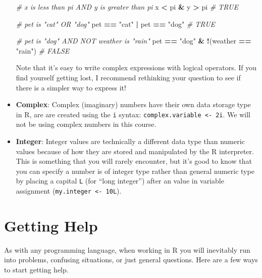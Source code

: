 \documentclass[]{book}
\newenvironment{Shaded}{\begin{snugshade}}{\end{snugshade}}
\newcommand{\StringTok}[1]{\textcolor[rgb]{0.31,0.60,0.02}{#1}}
\newcommand{\CommentTok}[1]{\textcolor[rgb]{0.56,0.35,0.01}{\textit{#1}}}
\newcommand{\OperatorTok}[1]{\textcolor[rgb]{0.81,0.36,0.00}{\textbf{#1}}}
\newcommand{\NormalTok}[1]{#1}
\theoremstyle{definition}
\theoremstyle{definition}
\theoremstyle{remark}
\begin{document}
\begin{itemize}
\begin{Shaded}
\begin{Highlighting}[]
\CommentTok{# x is less than pi AND y is greater than pi}
\NormalTok{x }\OperatorTok{<}\StringTok{ }\NormalTok{pi }\OperatorTok{&}\StringTok{ }\NormalTok{y }\OperatorTok{>}\StringTok{ }\NormalTok{pi  }\CommentTok{# TRUE}

\CommentTok{# pet is "cat" OR "dog"}
\NormalTok{pet }\OperatorTok{==}\StringTok{ "cat"} \OperatorTok{|}\StringTok{ }\NormalTok{pet }\OperatorTok{==}\StringTok{ "dog"}  \CommentTok{# TRUE}

\CommentTok{# pet is "dog" AND NOT weather is "rain"}
\NormalTok{pet }\OperatorTok{==}\StringTok{ "dog"} \OperatorTok{&}\StringTok{ }\OperatorTok{!}\NormalTok{(weather }\OperatorTok{==}\StringTok{ "rain"}\NormalTok{)  }\CommentTok{# FALSE}
\end{Highlighting}
\end{Shaded}

  Note that it's easy to write complex expressions with logical
  operators. If you find yourself getting lost, I recommend rethinking
  your question to see if there is a simpler way to express it!
\item
  \textbf{Complex}: Complex (imaginary) numbers have their own data
  storage type in R, are are created using the \texttt{i} syntax:
  \texttt{complex.variable\ \textless{}-\ 2i}. We will not be using
  complex numbers in this course.
\item
  \textbf{Integer}: Integer values are technically a different data type
  than numeric values because of how they are stored and manipulated by
  the R interpreter. This is something that you will rarely encounter,
  but it's good to know that you can specify a number is of integer type
  rather than general numeric type by placing a capital \texttt{L} (for
  ``long integer'') after an value in variable assignment
  (\texttt{my.integer\ \textless{}-\ 10L}).
\end{itemize}

\section{Getting Help}\label{gettinghelp}

As with any programming language, when working in R you will inevitably
run into problems, confusing situations, or just general questions. Here
are a few ways to start getting help.
\end{document}
